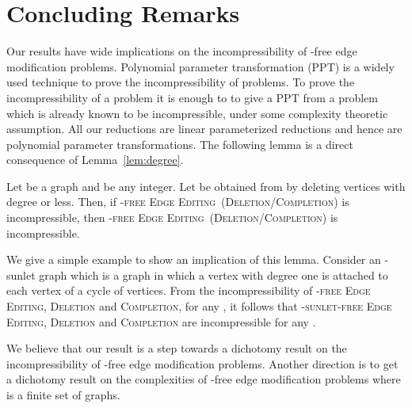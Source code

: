 \documentclass[envcountsame,envcountsect,10pt,oribibl]{llncs}
\newcommand{\pname}[1]{\textnormal{\textsc{#1}}}
\newcommand{\HEE}{\pname{-free Edge Editing}}
\newcommand{\HDEE}{\pname{-free Edge Editing}}
\begin{document}
\section{Concluding Remarks}

Our results have wide implications on the incompressibility of 
-free edge modification problems. Polynomial parameter transformation (PPT)
is a widely used technique to prove the incompressibility of 
problems. To prove the incompressibility of a problem
it is enough to to give a PPT from a problem which is already
known to be incompressible, under some complexity theoretic assumption.
All our reductions are
linear parameterized reductions and hence are polynomial
parameter transformations. The following lemma is a
direct consequence of Lemma~\ref{lem:degree}.

\begin{lemma}
  \label{lem:incompressibility}
  Let  be a graph and  be any integer. 
  Let  be obtained from  by deleting vertices with degree  or less.
  Then, if \HDEE~(\textsc{Deletion}/\textsc{Completion})
  is incompressible, then \HEE~(\textsc{Deletion}/\textsc{Completion}) is incompressible.
\end{lemma}

We give a simple example to show an implication of this lemma. Consider an 
-sunlet graph which is a graph in which 
a vertex with degree one is attached to each vertex of a cycle of  vertices.
From the incompressibility of \textsc{-free Edge Editing}, \textsc{Deletion} and \textsc{Completion},
for any , it follows that \textsc{-sunlet-free Edge Editing}, \textsc{Deletion} and \textsc{Completion}
are incompressible for any .

We believe that our result is a step towards a dichotomy result on the incompressibility of -free
edge modification problems. 
Another direction is to get a dichotomy result on the complexities of -free edge modification
problems where  is a finite set of graphs. 





\end{document}
